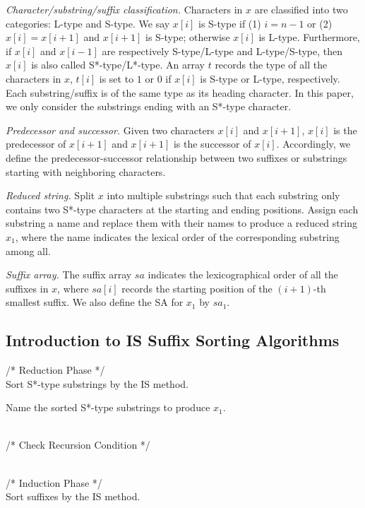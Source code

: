 \documentclass[10pt,journal,compsoc]{IEEEtran}
\begin{document}
{\em Character/substring/suffix classification.} Characters in $x$ are classified into two categories: L-type and S-type. We say $x[i]$ is S-type if (1) $i = n - 1$ or (2) $x[i] = x[i + 1]$ and $x[i + 1]$ is S-type; otherwise $x[i]$ is L-type. Furthermore, if $x[i]$ and $x[i - 1]$ are respectively S-type/L-type and L-type/S-type, then $x[i]$ is also called S*-type/L*-type. An array $t$ records the type of all the characters in $x$, $t[i]$ is set to $1$ or $0$ if $x[i]$ is S-type or L-type, respectively. Each substring/suffix is of the same type as its heading character. In this paper, we only consider the substrings ending with an S*-type character.

{\em Predecessor and successor.} Given two characters $x[i]$ and $x[i + 1]$, $x[i]$ is the predecessor of $x[i + 1]$ and $x[i + 1]$ is the successor of $x[i]$. Accordingly, we define the predecessor-successor relationship between two suffixes or substrings starting with neighboring characters.

{\em Reduced string.} Split $x$ into multiple substrings such that each substring only contains two S*-type characters at the starting and ending positions. Assign each substring a name and replace them with their names to produce a reduced string $x_1$, where the name indicates the lexical order of the corresponding substring among all.


{\em Suffix array.} The suffix array $sa$ indicates the lexicographical order of all the suffixes in $x$, where $sa[i]$ records the starting position of the $(i + 1)$-th smallest suffix. We also define the SA for $x_1$ by $sa_1$.

\subsection{Introduction to IS Suffix Sorting Algorithms} \label{subsec:improvement}

\begin{algorithm}
	\SetAlgoNoLine
	
	/* Reduction Phase */ \\
	Sort S*-type substrings by the IS method.
	
	Name the sorted S*-type substrings to produce $x_1$.
	
	~\\
	
	/* Check Recursion Condition */ \\	
	
	~\\
	
	/* Induction Phase */ \\
	Sort suffixes by the IS method.
	
	
	\caption{The general framework for an IS suffix sorting algorithm.}
	
	\label{alg:1}
\end{algorithm}
\end{document}
